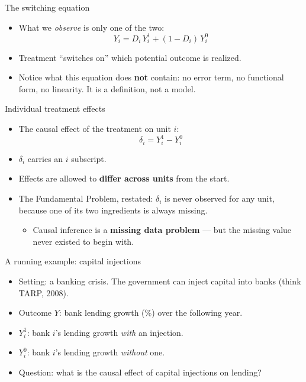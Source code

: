 \documentclass[
  11pt,
  ignorenonframetext,
  aspectratio=169,
]{beamer}
\providecommand{\tightlist}{%
  \setlength{\itemsep}{0pt}\setlength{\parskip}{0pt}}
\begin{document}
\begin{frame}{The switching equation}
\protect{}\label{the-switching-equation}
\begin{itemize}
\tightlist
\item
  What we \emph{observe} is only one of the two: \[
  Y_i = D_i\, Y_i^1 + (1 - D_i)\, Y_i^0
  \]
\item
  Treatment ``switches on'' which potential outcome is realized.
\item
  Notice what this equation does \textbf{not} contain: no error term, no
  functional form, no linearity. It is a definition, not a model.
\end{itemize}
\end{frame}

\begin{frame}{Individual treatment effects}
\protect{}\label{individual-treatment-effects}
\begin{itemize}
\tightlist
\item
  The causal effect of the treatment on unit \(i\): \[
  \delta_i = Y_i^1 - Y_i^0
  \]
\item
  \(\delta_i\) carries an \(i\) subscript.
\item
  Effects are allowed to \textbf{differ across units} from the start.
\item
  The Fundamental Problem, restated: \(\delta_i\) is never observed for
  any unit, because one of its two ingredients is always missing.

  \begin{itemize}
  \tightlist
  \item
    Causal inference is a \textbf{missing data problem} --- but the
    missing value never existed to begin with.
  \end{itemize}
\end{itemize}
\end{frame}

\begin{frame}{A running example: capital injections}
\protect{}\label{a-running-example-capital-injections}
\begin{itemize}
\tightlist
\item
  Setting: a banking crisis. The government can inject capital into
  banks (think TARP, 2008).
\item
  Outcome \(Y\): bank lending growth (\%) over the following year.
\item
  \(Y_i^1\): bank \(i\)'s lending growth \emph{with} an injection.
\item
  \(Y_i^0\): bank \(i\)'s lending growth \emph{without} one.
\item
  Question: what is the causal effect of capital injections on lending?
\end{itemize}
\end{frame}
\end{document}
